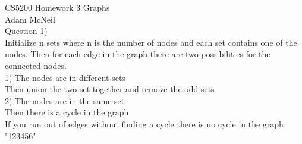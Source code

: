 \documentclass{article}
\begin{document}
CS5200 Homework 3 Graphs\\
Adam McNeil\\
Question 1) \\

Initialize n sets where n is the number of nodes and each set contains one of the nodes.
Then for each edge in the graph there are two possibilities for the connected nodes. \\
1) The nodes are in different sets\\
Then union the two set together and remove the odd sets\\
2) The nodes are in the same set\\
Then there is a cycle in the graph\\
If you run out of edges without finding a cycle there is no cycle in the graph
"{1}{2}{3}{4}{5}{6}"
\end{document}
